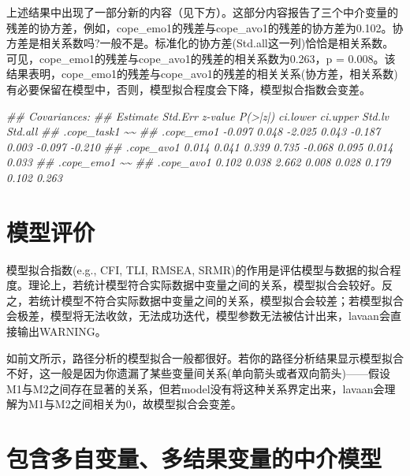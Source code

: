 \documentclass[
  chinese-hans,
  letterpaper,
  DIV=11,
  numbers=noendperiod]{scrartcl}
\newenvironment{Shaded}{\begin{snugshade}}{\end{snugshade}}
\newcommand{\DocumentationTok}[1]{\textcolor[rgb]{0.37,0.37,0.37}{\textit{#1}}}
\begin{document}
上述结果中出现了一部分新的内容（见下方）。这部分内容报告了三个中介变量的残差的协方差，例如，cope\_emo1的残差与cope\_avo1的残差的协方差为0.102。协方差是相关系数吗?一般不是。标准化的协方差(Std.all这一列)恰恰是相关系数。可见，cope\_emo1的残差与cope\_avo1的残差的相关系数为0.263，p
=
0.008。该结果表明，cope\_emo1的残差与cope\_avo1的残差的相关关系(协方差，相关系数)有必要保留在模型中，否则，模型拟合程度会下降，模型拟合指数会变差。

\begin{Shaded}
\begin{Highlighting}[numbers=left,,]
\DocumentationTok{\#\# Covariances:}
\DocumentationTok{\#\#                    Estimate  Std.Err  z{-}value  P(\textgreater{}|z|) ci.lower ci.upper   Std.lv  Std.all}
\DocumentationTok{\#\#  .cope\_task1 \textasciitilde{}\textasciitilde{}}
\DocumentationTok{\#\#    .cope\_emo1              {-}0.097    0.048   {-}2.025    0.043   {-}0.187    0.003   {-}0.097   {-}0.210}
\DocumentationTok{\#\#    .cope\_avo1               0.014    0.041    0.339    0.735   {-}0.068    0.095    0.014    0.033}
\DocumentationTok{\#\#  .cope\_emo1 \textasciitilde{}\textasciitilde{}}
\DocumentationTok{\#\#    .cope\_avo1               0.102    0.038    2.662    0.008    0.028    0.179    0.102    0.263}
\end{Highlighting}
\end{Shaded}

\section{模型评价}\label{ux6a21ux578bux8bc4ux4ef7}

模型拟合指数(e.g., CFI, TLI, RMSEA,
SRMR)的作用是评估模型与数据的拟合程度。理论上，若统计模型符合实际数据中变量之间的关系，模型拟合会较好。反之，若统计模型不符合实际数据中变量之间的关系，模型拟合会较差；若模型拟合会极差，模型将无法收敛，无法成功迭代，模型参数无法被估计出来，lavaan会直接输出WARNING。

如前文所示，路径分析的模型拟合一般都很好。若你的路径分析结果显示模型拟合不好，这一般是因为你遗漏了某些变量间关系(单向箭头或者双向箭头)------假设M1与M2之间存在显著的关系，但若model没有将这种关系界定出来，lavaan会理解为M1与M2之间相关为0，故模型拟合会变差。

\section{包含多自变量、多结果变量的中介模型}\label{ux5305ux542bux591aux81eaux53d8ux91cfux591aux7ed3ux679cux53d8ux91cfux7684ux4e2dux4ecbux6a21ux578b}
\end{document}
